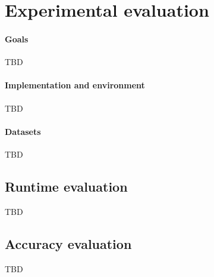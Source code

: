 \section{Experimental evaluation}\label{sec:exper}
\paragraph{Goals} TBD

\paragraph{Implementation and environment} TBD

\paragraph{Datasets} TBD

\subsection{Runtime evaluation}\label{sec:runtime}
TBD

\subsection{Accuracy evaluation}\label{sec:accuracy}
TBD
